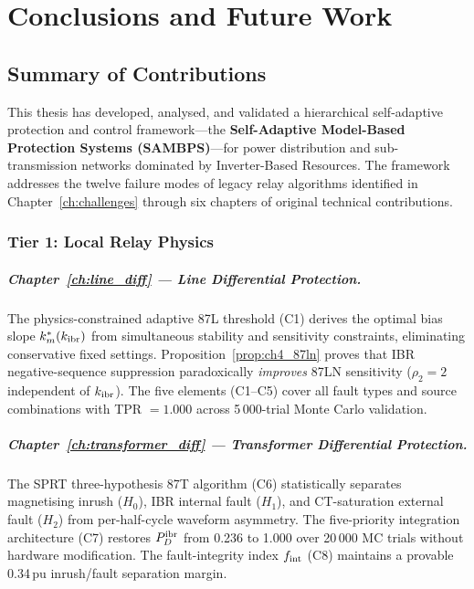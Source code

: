 \chapter{Conclusions and Future Work}
\label{ch:conclusions}

\section{Summary of Contributions}
\label{sec:ch10_summary}

This thesis has developed, analysed, and validated a hierarchical
self-adaptive protection and control framework—the \textbf{Self-Adaptive
Model-Based Protection Systems (SAMBPS)}—for power distribution and
sub-transmission networks dominated by Inverter-Based Resources.
The framework addresses the twelve failure modes of legacy relay
algorithms identified in Chapter~\ref{ch:challenges} through six chapters
of original technical contributions.

\subsection{Tier 1: Local Relay Physics}

\paragraph{Chapter~\ref{ch:line_diff} — Line Differential Protection.}
The physics-constrained adaptive 87L threshold (C1) derives the optimal
bias slope $k_m^\ast(k_{\mathrm{ibr}})$ from simultaneous stability and sensitivity
constraints, eliminating conservative fixed settings.
Proposition~\ref{prop:ch4_87ln} proves that IBR negative-sequence
suppression paradoxically \emph{improves} 87LN sensitivity ($\rho_2 = 2$
independent of $k_{\mathrm{ibr}}$). The five elements (C1--C5) cover all fault types and source combinations
with TPR $= 1.000$ across 5\,000-trial Monte Carlo validation.

\paragraph{Chapter~\ref{ch:transformer_diff} — Transformer Differential Protection.}
The SPRT three-hypothesis 87T algorithm (C6) statistically separates
magnetising inrush ($H_0$), IBR internal fault ($H_1$), and CT-saturation
external fault ($H_2$) from per-half-cycle waveform asymmetry.
The five-priority integration architecture (C7) restores $P_D^{\rm ibr}$
from 0.236 to 1.000 over 20\,000 MC trials without hardware modification.
The fault-integrity index $f_{\rm int}$ (C8) maintains a provable 0.34\,pu
inrush/fault separation margin.

